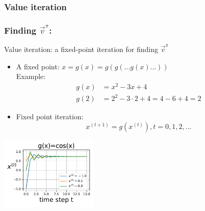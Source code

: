 \subsubsection{Value iteration}\label{sec:findviter}

\begin{frame}\frametitle{Finding $\vec v^\pi$:~\subsubsecname}

Value iteration: a fixed-point iteration for finding $\vec v^\pi$

\begin{itemize}
\item A fixed point: $x=g(x)=g(g(\ldots g(x)\ldots))$\\

Example:
\begin{align}
    g(x) &= x^{2} - 3x + 4\\
    g(2) &= 2^{2} - 3\cdot 2 + 4 = 4 - 6 + 4 = 2
\end{align}

\item Fixed point iteration:
\begin{equation}
x^{(t+1)} = g(x^{(t)}), t=0,1,2,\ldots
\end{equation}
\end{itemize}

\begin{center}
    \includegraphics[height=3.5cm]{img/fixed_point_iter_cos} 
\end{center}

\end{frame}


